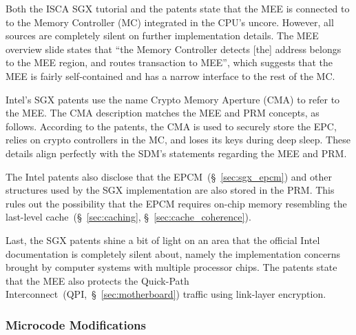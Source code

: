 
Both the ISCA SGX tutorial and the patents state that the MEE is connected to
to the Memory Controller (MC) integrated in the CPU's uncore. However, all
sources are completely silent on further implementation details. The
MEE overview slide states that ``the Memory Controller detects [the] address
belongs to the MEE region, and routes transaction to MEE'', which suggests that
the MEE is fairly self-contained and has a narrow interface to the rest of the
MC.



Intel's SGX patents use the name Crypto Memory Aperture (CMA) to refer to the
MEE. The CMA description matches the MEE and PRM concepts, as follows.
According to the patents, the CMA is used to securely store the EPC, relies on
crypto controllers in the MC, and loses its keys during deep sleep. These
details align perfectly with the SDM's statements regarding the MEE and PRM.


The Intel patents also disclose that the EPCM~(\S~\ref{sec:sgx_epcm}) and
other structures used by the SGX implementation are also stored in the PRM.
This rules out the possibility that the EPCM requires on-chip memory resembling
the last-level cache~(\S~\ref{sec:caching}, \S~\ref{sec:cache_coherence}).

Last, the SGX patents shine a bit of light on an area that the official Intel
documentation is completely silent about, namely the implementation concerns
brought by computer systems with multiple processor chips. The patents state
that the MEE also protects the
Quick-Path Interconnect~(QPI,~\S~\ref{sec:motherboard}) traffic using
link-layer encryption.


\subsubsection{Microcode Modifications}
\label{sec:sgx_microcode_modifications}

